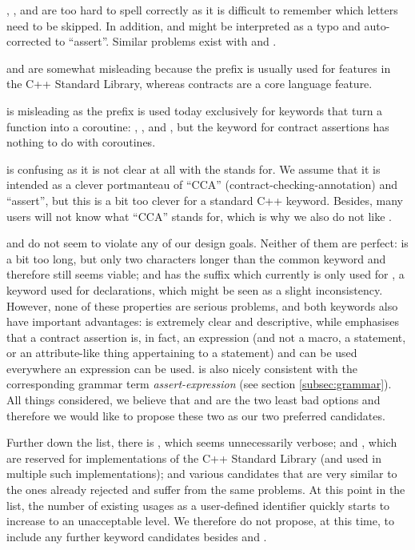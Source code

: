 , , and  are too hard to spell correctly as it is difficult to remember which letters need to be skipped. In addition,  and  might be interpreted as a typo and auto-corrected to ``assert''. Similar problems exist with  and .

 and  are somewhat misleading because the prefix  is usually used for features in the C++ Standard Library, whereas contracts are a core language feature.

 is misleading as the prefix  is used today exclusively for keywords that turn a function into a coroutine: , , and , but the keyword for contract assertions has nothing to do with coroutines.

 is confusing as it is not clear at all with the  stands for. We assume that it is intended as a clever portmanteau of ``CCA'' (contract-checking-annotation) and ``assert'', but this is a bit too clever for a standard C++ keyword. Besides, many users will not know what ``CCA'' stands for, which is why we also do not like .

 and  do not seem to violate any of our design goals. Neither of them are perfect:  is a bit too long, but only two characters longer than the common keyword  and therefore still seems viable; and  has the  suffix which currently is only used for , a keyword used for declarations, which might be seen as a slight inconsistency. However, none of these properties are serious problems, and both keywords also have important advantages: \mbox{} is extremely clear and descriptive, while  emphasises that a contract assertion is, in fact, an expression (and not a macro, a statement, or an attribute-like thing appertaining to a statement) and can be used everywhere an expression can be used.  is also nicely consistent with the corresponding grammar term \emph{assert-expression} (see section \ref{subsec:grammar}). All things considered, we believe that  and  are the two least bad options and therefore we would like to propose these two as our two preferred candidates.

Further down the list, there is , which seems unnecessarily verbose;  and , which are reserved for implementations of the C++ Standard Library (and used in multiple such implementations); and various candidates that are very similar to the ones already rejected and suffer from the same problems. At this point in the list, the number of existing usages as a user-defined identifier quickly starts to increase to an unacceptable level. We therefore do not propose, at this time, to include any further keyword candidates besides  and .

